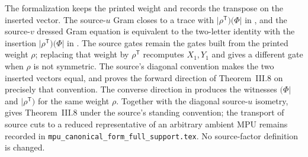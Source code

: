 \documentclass{article}
\begin{document}
The formalization keeps the printed weight 
and records the transpose on the inserted vector. The source-$u$ Gram closes
to a trace with $\lvert\rho^{\mathsf T})(\Phi\rvert$ in
,
and the source-$v$ dressed Gram equation is equivalent to the two-letter
identity with the insertion $\lvert\rho^{\mathsf T})(\Phi\rvert$ in
.
The source gates remain the gates built from the printed weight $\rho$; replacing
that weight by $\rho^{\mathsf T}$ recomputes $X_1,Y_1$ and gives a different
gate when $\rho$ is not symmetric. The source's diagonal convention makes the
two inserted vectors equal, and
 proves the forward
direction of Theorem~III.8 on precisely that convention. The
converse direction in
 produces the
witnesses $(\Phi\rvert$ and $\lvert\rho^{\mathsf T})$ for the same weight
$\rho$. Together with the diagonal source-$u$ isometry,
 gives Theorem~III.8
under the source's standing convention; the transport of source cuts to a
reduced representative of an arbitrary ambient MPU remains recorded in
\texttt{mpu\_canonical\_form\_full\_support.tex}. No source-factor
definition is changed.
\end{document}
